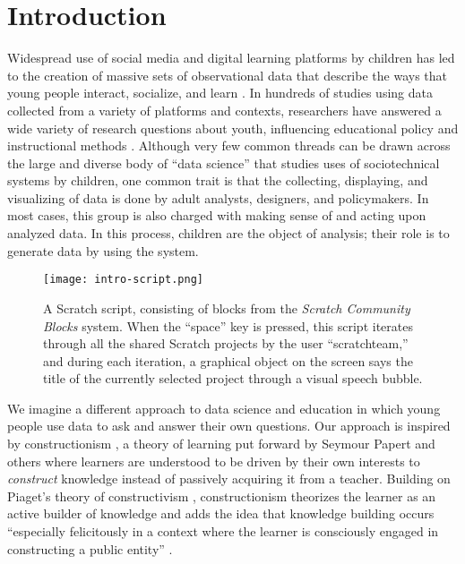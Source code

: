 \documentclass{sigchi}
\begin{document}
\section{Introduction}

Widespread use of social media and digital learning platforms by children has led to the creation of massive sets of observational data that describe the ways that young people interact, socialize, and learn \cite{bienkowski_enhancing_2012}. In hundreds of studies using data collected from a variety of platforms and contexts, researchers have answered a wide variety of research questions about youth, influencing educational policy and instructional methods \cite{willcox_online_2016}. Although very few common threads can be drawn across the large and diverse body of ``data science'' that studies uses of sociotechnical systems by children, one common trait is that the collecting, displaying, and visualizing of data is done by adult analysts, designers, and policymakers. In most cases, this group is also charged with making sense of and acting upon analyzed data. In this process, children are the object of analysis; their role is to generate data by using the system.

\begin{figure}[t] 
\texttt{[image: intro-script.png]}
\centering
\caption{A Scratch script, consisting of blocks from the \emph{Scratch Community Blocks} system. When the ``space'' key is pressed, this script iterates through all the shared Scratch projects by the user ``scratchteam,'' and during each iteration, a graphical object on the screen says the title of the currently selected project through a visual speech bubble.}
\label{fig:intro-script}
\end{figure}

We imagine a different approach to data science and education in which young people use data to ask and answer their own questions. Our approach is inspired by constructionism \cite{papert_mindstorms:_1980}, a theory of learning put forward by Seymour Papert and others where learners are understood to be driven by their own interests to \emph{construct} knowledge instead of passively acquiring it from a teacher. Building on Piaget's theory of constructivism \cite{piaget_genetic_1970}, constructionism theorizes the learner as an active builder of knowledge and adds the idea that knowledge building occurs ``especially felicitously in a context where the learner is consciously engaged in constructing a public entity'' \cite{papert_situating_1991}.
\end{document}
